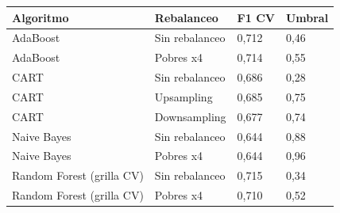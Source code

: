 
\begin{tabular}{llll}
\toprule
Algoritmo & Rebalanceo & F1 CV & Umbral\\
\midrule
AdaBoost & Sin rebalanceo & 0,712 & 0,46\\
AdaBoost & Pobres x4 & 0,714 & 0,55\\
CART & Sin rebalanceo & 0,686 & 0,28\\
CART & Upsampling & 0,685 & 0,75\\
CART & Downsampling & 0,677 & 0,74\\
Naive Bayes & Sin rebalanceo & 0,644 & 0,88\\
Naive Bayes & Pobres x4 & 0,644 & 0,96\\
Random Forest (grilla CV) & Sin rebalanceo & 0,715 & 0,34\\
Random Forest (grilla CV) & Pobres x4 & 0,710 & 0,52\\
\bottomrule
\end{tabular}
